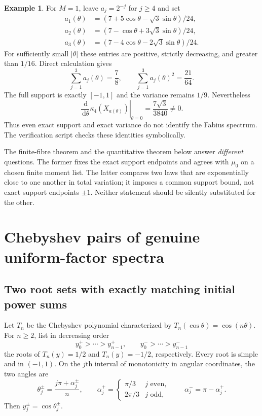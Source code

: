 \documentclass[11pt,a4paper]{article}
\theoremstyle{definition}
\newtheorem{example}[theorem]{Example}
\theoremstyle{remark}
\newcommand{\dd}{\,\mathrm d}
\begin{document}
\begin{example}\label{ex:curve}
For $M=1$, leave $a_j=2^{-j}$ for $j\ge4$ and set
\begin{align*}
 a_1(\theta)&=(7+5\cos\theta-\sqrt3\sin\theta)/24,\\
 a_2(\theta)&=(7-\cos\theta+3\sqrt3\sin\theta)/24,\\
 a_3(\theta)&=(7-4\cos\theta-2\sqrt3\sin\theta)/24.
\end{align*}
For sufficiently small $|\theta|$ these entries are positive, strictly
decreasing, and greater than $1/16$. Direct calculation gives
\[
 \sum_{j=1}^3a_j(\theta)=\frac78,\qquad
 \sum_{j=1}^3a_j(\theta)^2=\frac{21}{64}.
\]
The full support is exactly $[-1,1]$ and the variance remains $1/9$.
Nevertheless
\[
 \left.\frac{\dd}{\dd\theta}\kappa_4(X_{a(\theta)})\right|_{\theta=0}
       =\frac{7\sqrt3}{3840}\ne0.
\]
Thus even exact support and exact variance do not identify the Fabius
spectrum. The verification script checks these identities symbolically.
\end{example}

The finite-fibre theorem and the quantitative theorem below answer
\emph{different} questions. The former fixes the exact support endpoints
and agrees with $\mu_0$ on a chosen finite moment list. The latter compares
two laws that are exponentially close to one another in total variation;
it imposes a common support bound, not exact support endpoints $\pm1$.
Neither statement should be silently substituted for the other.

\section{Chebyshev pairs of genuine uniform-factor spectra}
\label{sec:chebyshev}

\subsection{Two root sets with exactly matching initial power sums}

Let $T_n$ be the Chebyshev polynomial characterized by
$T_n(\cos\theta)=\cos(n\theta)$. For $n\ge2$, list in decreasing order
\[
 y_0^+>\cdots>y_{n-1}^+,\qquad
 y_0^->\cdots>y_{n-1}^-
\]
the roots of $T_n(y)=1/2$ and $T_n(y)=-1/2$, respectively. Every root is
simple and in $(-1,1)$. On the $j$th interval of monotonicity in angular
coordinates, the two angles are
\begin{equation}\label{eq:angles}
 \theta_j^\pm=\frac{j\pi+\alpha_j^\pm}{n},\qquad
 \alpha_j^+=
 \begin{cases}\pi/3&j\text{ even},\\2\pi/3&j\text{ odd},\end{cases}
 \qquad \alpha_j^-=\pi-\alpha_j^+.
\end{equation}
Then $y_j^\pm=\cos\theta_j^\pm$.
\end{document}
